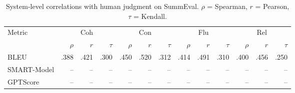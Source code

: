 \begin{table}[t]
\centering
\caption{System-level correlations with human judgment on SummEval. $\rho$ = Spearman, $r$ = Pearson, $\tau$ = Kendall.}
\label{tab:correlations_system}
\begin{tabular}{lrrrrrrrrrrrr}
\toprule
Metric & \multicolumn{3}{c}{Coh} & \multicolumn{3}{c}{Con} & \multicolumn{3}{c}{Flu} & \multicolumn{3}{c}{Rel} \\
\cmidrule(lr){2-4} \cmidrule(lr){5-7} \cmidrule(lr){8-10} \cmidrule(lr){11-13} 
  & $\rho$ & $r$ & $\tau$ & $\rho$ & $r$ & $\tau$ & $\rho$ & $r$ & $\tau$ & $\rho$ & $r$ & $\tau$ \\
\midrule
BLEU & .388 & .421 & .300 & .450 & .520 & .312 & .414 & .491 & .310 & .400 & .456 & .250 \\
SMART-Model & -- & -- & -- & -- & -- & -- & -- & -- & -- & -- & -- & -- \\
GPTScore & -- & -- & -- & -- & -- & -- & -- & -- & -- & -- & -- & -- \\
\bottomrule
\end{tabular}
\end{table}
